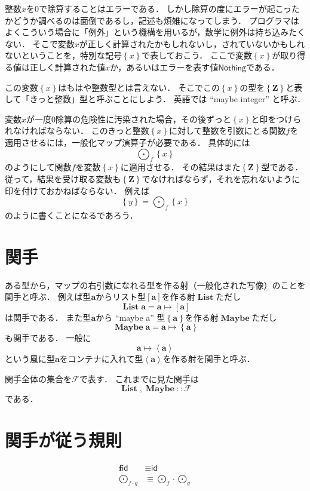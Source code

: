 \documentclass[twocolumn]{jsbook}
\newcommand{\mapfunc}{\bigodot}
\newcommand{\typename}[1]{\bm{#1}}
\newcommand{\integertype}{\typename{Z}}
\newcommand{\typeclassname}[1]{\mathcal{#1}}
\newcommand{\functortypeclass}{\typeclassname{F}}
\newcommand{\generalcontainer}[1]{\left\langle#1\right\rangle}
\newcommand{\listtype}[1]{\left[#1\right]}
\newcommand{\maybe}[1]{\left\{#1\right\}}
\newcommand{\functor}[1]{\mathop{\textbf{#1}}}
\newcommand{\listfunctor}{\mathop{\functor{List}}}
\newcommand{\maybefunctor}{\mathop{\functor{Maybe}}}
\newcommand{\specialkeyword}[1]{\textsf{#1}}
\newcommand{\identity}{\specialkeyword{id}}
\newcommand{\nothing}{\specialkeyword{Nothing}}
\begin{document}
整数$x$を$0$で除算することはエラーである．
しかし除算の度にエラーが起こったかどうか調べるのは面倒であるし，記述も煩雑になってしまう．
プログラマはよくこういう場合に「例外」という機構を用いるが，数学に例外は持ち込みたくない．
そこで変数$x$が正しく計算されたかもしれないし，されていないかもしれないということを，特別な記号$\maybe{x}$で表しておこう．
ここで変数$\maybe{x}$が取り得る値は正しく計算された値$x$か，あるいはエラーを表す値$\nothing$である．

この変数$\maybe{x}$はもはや整数型とは言えない．
そこでこの$\maybe{x}$の型を$\maybe{\integertype}$と表して「きっと整数」型と呼ぶことにしよう．
英語では ``maybe integer'' と呼ぶ．

変数$x$が一度$0$除算の危険性に汚染された場合，その後ずっと$\maybe{x}$と印をつけられなければならない．
このきっと整数$\maybe{x}$に対して整数を引数にとる関数$f$を適用させるには，一般化マップ演算子が必要である．
具体的には$$\mapfunc_f\maybe{x}$$のようにして関数$f$を変数$\maybe{x}$に適用させる．
その結果はまた$\maybe{\integertype}$型である．
従って，結果を受け取る変数も$\maybe{\integertype}$でなければならず，それを忘れないように印を付けておかねばならない．
例えば$$\maybe{y}=\mapfunc_f\maybe{x}$$のように書くことになるであろう．

\section{関手}

ある型から，マップの右引数になれる型を作る射（一般化された写像）のことを関手と呼ぶ．
例えば型$\typename{a}$からリスト型$[\typename{a}]$を作る射$\listfunctor$ただし$$\listfunctor\typename{a}=\typename{a}\mapsto\listtype{\typename{a}}$$は関手である．
また型$\typename{a}$から ``maybe a'' 型$\maybe{\typename{a}}$を作る射$\maybefunctor$ただし$$\maybefunctor\typename{a}=\typename{a}\mapsto\maybe{\typename{a}}$$も関手である．
一般に$$\typename{a}\mapsto\generalcontainer{\typename{a}}$$という風に型$\typename{a}$をコンテナに入れて型$\generalcontainer{\typename{a}}$を作る射を関手と呼ぶ．

関手全体の集合を$\functortypeclass$で表す．
これまでに見た関手は$$\listfunctor,\maybefunctor::\functortypeclass$$である．

\section{関手が従う規則}

\begin{align}
\functor{f}\identity&\equiv\identity\\
\mapfunc_{f\cdot g}&\equiv\mapfunc_f\cdot\mapfunc_g
\end{align}
\end{document}
